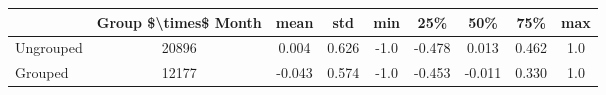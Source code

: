 \begin{tabular}{lcccccccc}
\toprule
{} &  Group \$\textbackslash times\$ Month &   mean &    std &  min &    25\% &    50\% &    75\% &  max \\
\midrule
Ungrouped &                 20896 &  0.004 &  0.626 & -1.0 & -0.478 &  0.013 &  0.462 &  1.0 \\
Grouped   &                 12177 & -0.043 &  0.574 & -1.0 & -0.453 & -0.011 &  0.330 &  1.0 \\
\bottomrule
\end{tabular}
